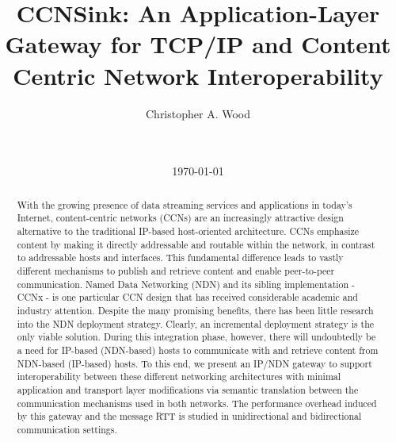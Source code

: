\documentclass{sigcomm}
\begin{document}
\title{CCNSink: An Application-Layer Gateway for TCP/IP and Content Centric Network Interoperability}

\author{
\alignauthor
Christopher A. Wood\\ %
       \\
       \\
}

\date{\today}

\maketitle
\begin{abstract}
With the growing presence of data streaming services and applications in today's Internet, content-centric networks (CCNs) are an increasingly attractive design alternative to the traditional IP-based host-oriented architecture. CCNs emphasize content by making it directly addressable and routable within the network, in contrast to addressable hosts and interfaces. This fundamental difference leads to vastly different mechanisms to publish and retrieve content and enable peer-to-peer communication. Named Data Networking (NDN) and its sibling implementation - CCNx - is one particular CCN design that has received considerable academic and industry attention. Despite the many promising benefits, there has been little research into the NDN deployment strategy. Clearly, an incremental deployment strategy is the only viable solution. During this integration phase, however, there will undoubtedly be a need for IP-based (NDN-based) hosts to communicate with and retrieve content from NDN-based (IP-based) hosts. To this end, we present an IP/NDN gateway to support interoperability between these different networking architectures with minimal application and transport layer modifications via semantic translation between the communication mechanisms used in both networks. The performance overhead induced by this gateway and the message RTT is studied in unidirectional and bidirectional communication settings.
\end{abstract}



\end{document}
